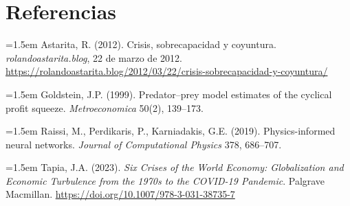 \documentclass[11pt]{article}
\begin{document}
\section*{Referencias}
{\small
\setlength{\parindent}{0pt}
\setlength{\parskip}{4pt}
\hangindent=1.5em Astarita, R. (2012). Crisis, sobrecapacidad y coyuntura. \emph{rolandoastarita.blog}, 22 de marzo de 2012. \url{https://rolandoastarita.blog/2012/03/22/crisis-sobrecapacidad-y-coyuntura/}\par
\hangindent=1.5em Goldstein, J.P. (1999). Predator--prey model estimates of the cyclical profit squeeze. \emph{Metroeconomica} 50(2), 139--173.\par
\hangindent=1.5em Raissi, M., Perdikaris, P., Karniadakis, G.E. (2019). Physics-informed neural networks. \emph{Journal of Computational Physics} 378, 686--707.\par
\hangindent=1.5em Tapia, J.A. (2023). \emph{Six Crises of the World Economy: Globalization and Economic Turbulence from the 1970s to the COVID-19 Pandemic}. Palgrave Macmillan. \url{https://doi.org/10.1007/978-3-031-38735-7}\par
}
\end{document}
